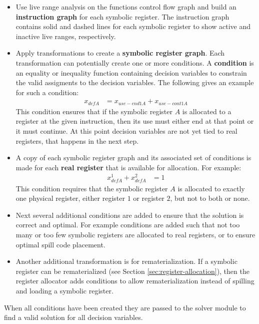 \documentclass[a4paper,10pt]{article}
\begin{document}
\begin{itemize}
 \item Use live range analysis on the functions control flow graph and build an \textbf{instruction graph} for each symbolic register. 
       The instruction graph contains solid and dashed lines for each symbolic register to show active and inactive live ranges, 
       respectively.
 \item Apply transformations to create a \textbf{symbolic register graph}. Each transformation can potentially create one or more
       conditions. A \textbf{condition} is an equality or inequality function containing decision variables to constrain the valid 
       assigments to the decision variables. The following gives an example for such a condition: 
       \begin{align}
        x_{defA} &= x_{use-end1A} + x_{use-cont1A}
       \end{align}
       This condition ensures that if the symbolic register $A$ is allocated to a register at the given instruction, then its use must 
       either end at that point or it must continue. At this point decision variables are not yet tied to real registers, that happens
       in the next step.
 \item A copy of each symbolic register graph and its associated set of conditions is made for each \textbf{real register} that is
       available for allocation. For example:
       \begin{align}
        x^1_{defA} + x^2_{defA} &= 1
       \end{align}
       This condition requires that the symbolic register $A$ is allocated to exactly one physical register, either register $1$ or 
       register $2$, but not to both or none.
 \item Next several additional conditions are added to ensure that the solution is correct and optimal. For example conditions are 
       added such that not too many or too few symbolic registers are allocated to real registers, or to ensure optimal spill code 
       placement.
 \item Another additional transformation is for rematerialization. If a symbolic register can be rematerialized (see Section 
       \ref{sec:register-allocation}), then the register allocator adds conditions to allow rematerialization instead of spilling
       and loading a symbolic register.
\end{itemize}

When all conditions have been created they are passed to the solver module to find a valid solution for all decision variables.
\end{document}
